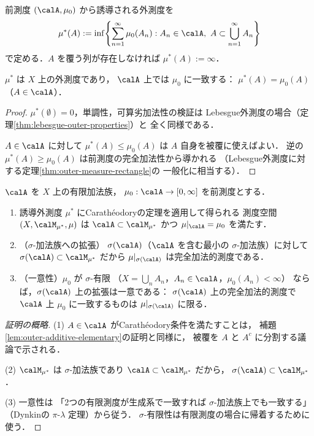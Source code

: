 \begin{definition}[誘導外測度]\label{def:induced-outer-measure}
前測度 $(\calA, \mu_0)$ から誘導される外測度を
\[
\mu^*(A)
:= \inf\!\left\{
\sum_{n=1}^{\infty} \mu_0(A_n)
: A_n \in \calA,\ A \subset \bigcup_{n=1}^{\infty} A_n
\right\}
\]
で定める．$A$ を覆う列が存在しなければ $\mu^*(A) := \infty$．
\end{definition}

\begin{proposition}\label{prop:induced-is-outer}
$\mu^*$ は $X$ 上の外測度であり，
$\calA$ 上では $\mu_0$ に一致する：
$\mu^*(A) = \mu_0(A)$（$A \in \calA$）．
\end{proposition}
\begin{proof}
$\mu^*(\emptyset) = 0$，単調性，可算劣加法性の検証は
Lebesgue外測度の場合（定理\ref{thm:lebesgue-outer-properties}）と
全く同様である．

$A \in \calA$ に対して
$\mu^*(A) \le \mu_0(A)$ は $A$ 自身を被覆に使えばよい．
逆の $\mu^*(A) \ge \mu_0(A)$ は前測度の完全加法性から導かれる
（Lebesgue外測度に対する定理\ref{thm:outer-measure-rectangle}の
一般化に相当する）．
\end{proof}

\begin{theorem}\label{thm:caratheodory-extension}
$\calA$ を $X$ 上の有限加法族，
$\mu_0 : \calA \to [0, \infty]$ を前測度とする．
\begin{enumerate}
\item 誘導外測度 $\mu^*$ にCarath\'eodoryの定理を適用して得られる
測度空間 $(X, \calM_{\mu^*}, \mu)$ は
$\calA \subset \calM_{\mu^*}$
かつ $\mu|_{\calA} = \mu_0$ を満たす．
\item （$\sigma$-加法族への拡張）
$\sigma(\calA)$（$\calA$ を含む最小の $\sigma$-加法族）に対して
$\sigma(\calA) \subset \calM_{\mu^*}$
だから $\mu|_{\sigma(\calA)}$ は完全加法的測度である．
\item （一意性）$\mu_0$ が $\sigma$-有限
（$X = \bigcup_n A_n$，$A_n \in \calA$，$\mu_0(A_n) < \infty$）
ならば，$\sigma(\calA)$ 上の拡張は一意である：
$\sigma(\calA)$ 上の完全加法的測度で $\calA$ 上 $\mu_0$ に一致するものは
$\mu|_{\sigma(\calA)}$ に限る．
\end{enumerate}
\end{theorem}
\begin{proof}[証明の概略]
(1) $A \in \calA$ がCarath\'eodory条件を満たすことは，
補題\ref{lem:outer-additive-elementary}の証明と同様に，
被覆を $A$ と $A^c$ に分割する議論で示される．

(2) $\calM_{\mu^*}$ は $\sigma$-加法族であり $\calA \subset \calM_{\mu^*}$ だから，
$\sigma(\calA) \subset \calM_{\mu^*}$．

(3) 一意性は
「2つの有限測度が生成系で一致すれば $\sigma$-加法族上でも一致する」
（Dynkinの $\pi$-$\lambda$ 定理）から従う．
$\sigma$-有限性は有限測度の場合に帰着するために使う．
\end{proof}

